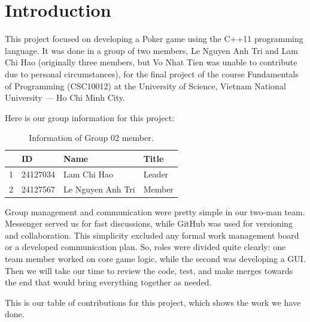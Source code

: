 \section{Introduction}
\label{sec:introduction}

\hspace{1cm} This project focused on developing a Poker game using the C++11 programming language. It was done in a group of two members, Le Nguyen Anh Tri and Lam Chi Hao (originally three members, but Vo Nhat Tien was unable to contribute due to personal circumstances), for the final project of the course Fundamentals of Programming (CSC10012) at the University of Science, Vietnam National University — Ho Chi Minh City.

\vspace{0.5cm}

\hspace{1cm} Here is our group information for this project:

\begin{table}[ht]
    \centering
    \begin{tabular}{| m{1.75cm} | m{2cm} | m{5cm}| m{2.5cm} |} 
    \hline
    \textbf{} & \textbf{ID} & \textbf{Name} & \textbf{Title} \\ 
    \hline
    1 & 24127034 & Lam Chi Hao & Leader \\ 
    \hline
    2 & 24127567 & Le Nguyen Anh Tri & Member \\ 
    \hline
    \end{tabular}
    \caption{Information of Group 02 member.}
    \label{tab:group-information}
\end{table}

\hspace{1cm} Group management and communication were pretty simple in our two-man team. Messenger served us for fast discussions, while GitHub was used for versioning and collaboration. This simplicity excluded any formal work management board or a developed communication plan. So, roles were divided quite clearly: one team member worked on core game logic, while the second was developing a GUI. Then we will take our time to review the code, test, and make merges towards the end that would bring everything together as needed.

\vspace{0.5cm}

\hspace{1cm} This is our table of contributions for this project, which shows the work we have done.

